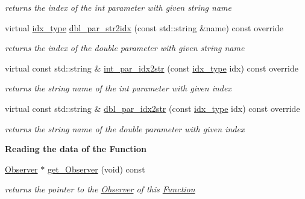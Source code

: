 \begin{Indent}
\begin{DoxyCompactItemize}
\begin{DoxyCompactList}\small\item\em returns the index of the int parameter with given string name \end{DoxyCompactList}\item 
virtual \mbox{\hyperlink{class_s_m_spp__di__unipi__it_1_1_thin_compute_interface_aa3d710629ad8c434286726ad810c3b47}{idx\+\_\+type}} \mbox{\hyperlink{class_s_m_spp__di__unipi__it_1_1_function_a6d353ac3d1200d9bea89235da61bc4f3}{dbl\+\_\+par\+\_\+str2idx}} (const std\+::string \&name) const override
\begin{DoxyCompactList}\small\item\em returns the index of the double parameter with given string name \end{DoxyCompactList}\item 
virtual const std\+::string \& \mbox{\hyperlink{class_s_m_spp__di__unipi__it_1_1_function_a61e973f39747f63b8f56d97cc62e32ce}{int\+\_\+par\+\_\+idx2str}} (const \mbox{\hyperlink{class_s_m_spp__di__unipi__it_1_1_thin_compute_interface_aa3d710629ad8c434286726ad810c3b47}{idx\+\_\+type}} idx) const override
\begin{DoxyCompactList}\small\item\em returns the string name of the int parameter with given index \end{DoxyCompactList}\item 
virtual const std\+::string \& \mbox{\hyperlink{class_s_m_spp__di__unipi__it_1_1_function_a93f1297e7910e91cc18b303376191026}{dbl\+\_\+par\+\_\+idx2str}} (const \mbox{\hyperlink{class_s_m_spp__di__unipi__it_1_1_thin_compute_interface_aa3d710629ad8c434286726ad810c3b47}{idx\+\_\+type}} idx) const override
\begin{DoxyCompactList}\small\item\em returns the string name of the double parameter with given index \end{DoxyCompactList}\end{DoxyCompactItemize}
\end{Indent}
\begin{Indent}\textbf{ Reading the data of the Function}\par
\begin{DoxyCompactItemize}
\item 
\mbox{\label{class_s_m_spp__di__unipi__it_1_1_function_a00e67a1626f50ce42ff1b9f812726245}} 
\mbox{\hyperlink{class_s_m_spp__di__unipi__it_1_1_observer}{Observer}} $\ast$ \mbox{\hyperlink{class_s_m_spp__di__unipi__it_1_1_function_a00e67a1626f50ce42ff1b9f812726245}{get\+\_\+\+Observer}} (void) const
\begin{DoxyCompactList}\small\item\em returns the pointer to the \mbox{\hyperlink{class_s_m_spp__di__unipi__it_1_1_observer}{Observer}} of this \mbox{\hyperlink{class_s_m_spp__di__unipi__it_1_1_function}{Function}} \end{DoxyCompactList}\end{DoxyCompactItemize}
\end{Indent}
